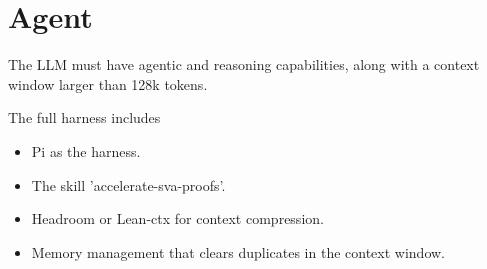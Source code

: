 \section{Agent}
\label{sec:harness}

The LLM must have agentic and reasoning capabilities, along with a context window larger than 128k tokens.

The full harness includes
\begin{itemize}
    \item Pi as the harness.
    \item The skill 'accelerate-sva-proofs'.
    \item Headroom or Lean-ctx for context compression.
    \item Memory management that clears duplicates in the context window.
\end{itemize}
